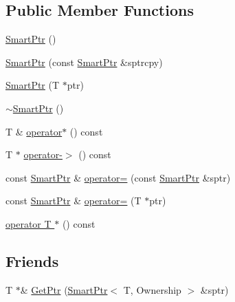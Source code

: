 \subsection*{Public Member Functions}
\begin{DoxyCompactItemize}
\item 
\hyperlink{class_agmd_utilities_1_1_smart_ptr_af535219cccfc3bd49ee5477967e6b8be}{Smart\+Ptr} ()
\item 
\hyperlink{class_agmd_utilities_1_1_smart_ptr_a3f4c4c89bedc5ce45f4cc8e99365934b}{Smart\+Ptr} (const \hyperlink{class_agmd_utilities_1_1_smart_ptr}{Smart\+Ptr} \&sptrcpy)
\item 
\hyperlink{class_agmd_utilities_1_1_smart_ptr_a4d6c8a5d2e738149c0b8c1fe3b725d0a}{Smart\+Ptr} (T $\ast$ptr)
\item 
\hyperlink{class_agmd_utilities_1_1_smart_ptr_a150140235baae6f831073ab0bb0901bd}{$\sim$\+Smart\+Ptr} ()
\item 
T \& \hyperlink{class_agmd_utilities_1_1_smart_ptr_a7a06109fb7026a86e0ab39f6214d366f}{operator$\ast$} () const 
\item 
T $\ast$ \hyperlink{class_agmd_utilities_1_1_smart_ptr_a020a87f636656edc1c3f698cea757e91}{operator-\/$>$} () const 
\item 
const \hyperlink{class_agmd_utilities_1_1_smart_ptr}{Smart\+Ptr} \& \hyperlink{class_agmd_utilities_1_1_smart_ptr_a30daa1711cf3c6d940453a7ee295f7d4}{operator=} (const \hyperlink{class_agmd_utilities_1_1_smart_ptr}{Smart\+Ptr} \&sptr)
\item 
const \hyperlink{class_agmd_utilities_1_1_smart_ptr}{Smart\+Ptr} \& \hyperlink{class_agmd_utilities_1_1_smart_ptr_af4727c0422c5e578364564377a673927}{operator=} (T $\ast$ptr)
\item 
\hyperlink{class_agmd_utilities_1_1_smart_ptr_a5f52741a61993d7ecb4c6e8dcbbca6fc}{operator T $\ast$} () const 
\end{DoxyCompactItemize}
\subsection*{Friends}
\begin{DoxyCompactItemize}
\item 
T $\ast$\& \hyperlink{class_agmd_utilities_1_1_smart_ptr_a9d077cdb3de50dc211ee47cdfff9375c}{Get\+Ptr} (\hyperlink{class_agmd_utilities_1_1_smart_ptr}{Smart\+Ptr}$<$ T, Ownership $>$ \&sptr)
\end{DoxyCompactItemize}


